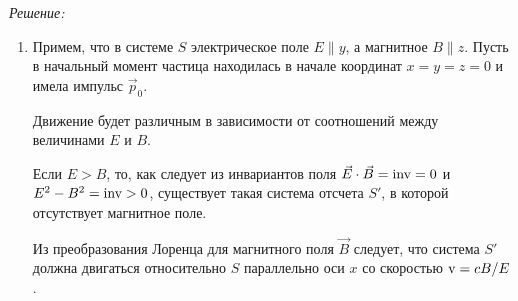 \vspace*{2em}
\emph{Решение:}
\begin{enumerate}
    \item Примем, что в системе \( S \) электрическое поле \( E \| y \), а
    магнитное \( B \| z \). Пусть в начальный момент частица находилась в начале
    координат \( x = y = z = 0 \) и имела импульс \( \vec{p}_0 \).
    
    Движение будет различным в зависимости от соотношений между величинами
    \( E \) и \( B \).
    
    Если \( E > B \), то, как следует из инвариантов поля \( \vec{E}\cdot\vec{B}
    = \mathrm{inv} = 0 \) и \( E^2 - B^2 = \mathrm{inv} > 0 \), существует такая система отсчета
    \( S' \), в которой отсутствует магнитное поле.
    
    Из преобразования Лоренца для магнитного поля \( \vec{B} \)
    следует, что система \( S' \) должна двигаться относительно \( S \)
    параллельно оси \( x \) со скоростью \( \mathrm{v} = cB/E \).
    

\end{enumerate}
